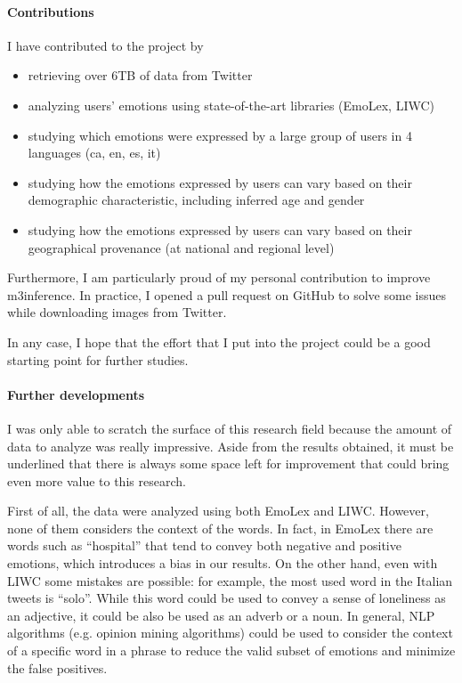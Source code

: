 \paragraph{Contributions}

I have contributed to the project by
    
\begin{itemize}
    	\item retrieving over 6TB of data from Twitter
    	\item analyzing users' emotions using state-of-the-art libraries (EmoLex, LIWC)
    	\item studying which emotions were expressed by a large group of users in 4 languages (ca, en, es, it)
    	\item studying how the emotions expressed by users can vary based on their demographic characteristic, including inferred age and gender
    	\item studying how the emotions expressed by users can vary based on their geographical provenance (at national and regional level)
\end{itemize}

Furthermore, I am particularly proud of my personal contribution to improve m3inference. In practice, I opened a pull request on GitHub to solve some issues while downloading images from Twitter.

In any case, I hope that the effort that I put into the project could be a good starting point for further studies.

\paragraph{Further developments}

I was only able to scratch the surface of this research field because the amount of data to analyze was really impressive. Aside from the results obtained, it must be underlined that there is always some space left for improvement that could bring even more value to this research.

First of all, the data were analyzed using both EmoLex and LIWC. However, none of them considers the context of the words. In fact, in EmoLex there are words such as “hospital” that tend to convey both negative and positive emotions, which introduces a bias in our results. On the other hand, even with LIWC some mistakes are possible: for example, the most used word in the Italian tweets is “solo”. While this word could be used to convey a sense of loneliness as an adjective, it could be also be used as an adverb or a noun. In general, NLP algorithms (e.g. opinion mining algorithms) could be used to consider the context of a specific word in a phrase to reduce the valid subset of emotions and minimize the false positives.

